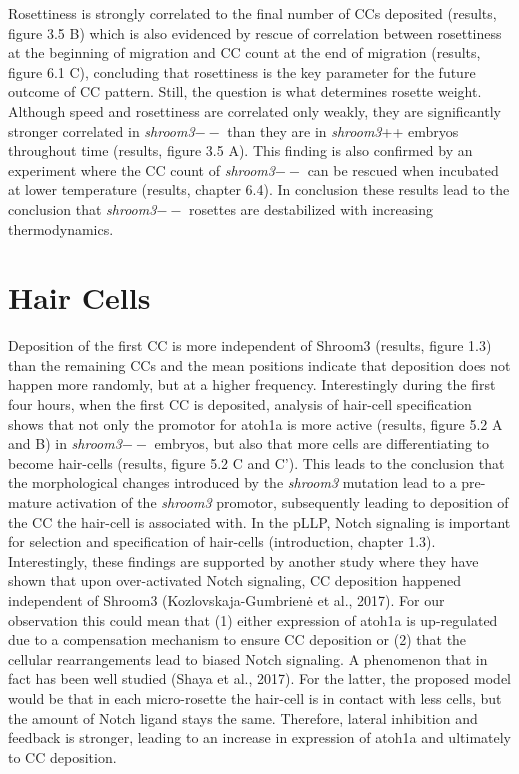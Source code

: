 \documentclass[11pt,singlespacinge,twoside]{reedthesis} %
\begin{document}
Rosettiness is strongly correlated to the final number of CCs deposited (results, figure 3.5 B) which is also evidenced by rescue of correlation between rosettiness at the beginning of migration and CC count at the end of migration (results, figure 6.1 C), concluding that rosettiness is the key parameter for the future outcome of CC pattern. Still, the question is what determines rosette weight. Although speed and rosettiness are correlated only weakly, they are significantly stronger correlated in \emph{shroom3}\(--\) than they are in \emph{shroom3}++ embryos throughout time (results, figure 3.5 A). This finding is also confirmed by an experiment where the CC count of \emph{shroom3}\(--\) can be rescued when incubated at lower temperature (results, chapter 6.4). In conclusion these results lead to the conclusion that \emph{shroom3}\(--\) rosettes are destabilized with increasing thermodynamics.

\hypertarget{hair-cells}{%
\section{Hair Cells}\label{hair-cells}}

Deposition of the first CC is more independent of Shroom3 (results, figure 1.3) than the remaining CCs and the mean positions indicate that deposition does not happen more randomly, but at a higher frequency. Interestingly during the first four hours, when the first CC is deposited, analysis of hair-cell specification shows that not only the promotor for atoh1a is more active (results, figure 5.2 A and B) in \emph{shroom3}\(--\) embryos, but also that more cells are differentiating to become hair-cells (results, figure 5.2 C and C'). This leads to the conclusion that the morphological changes introduced by the \emph{shroom3} mutation lead to a pre-mature activation of the \emph{shroom3} promotor, subsequently leading to deposition of the CC the hair-cell is associated with. In the pLLP, Notch signaling is important for selection and specification of hair-cells (introduction, chapter 1.3). Interestingly, these findings are supported by another study where they have shown that upon over-activated Notch signaling, CC deposition happened independent of Shroom3 (Kozlovskaja-Gumbrienė et al., 2017). For our observation this could mean that (1) either expression of atoh1a is up-regulated due to a compensation mechanism to ensure CC deposition or (2) that the cellular rearrangements lead to biased Notch signaling. A phenomenon that in fact has been well studied (Shaya et al., 2017). For the latter, the proposed model would be that in each micro-rosette the hair-cell is in contact with less cells, but the amount of Notch ligand stays the same. Therefore, lateral inhibition and feedback is stronger, leading to an increase in expression of atoh1a and ultimately to CC deposition.
\end{document}
